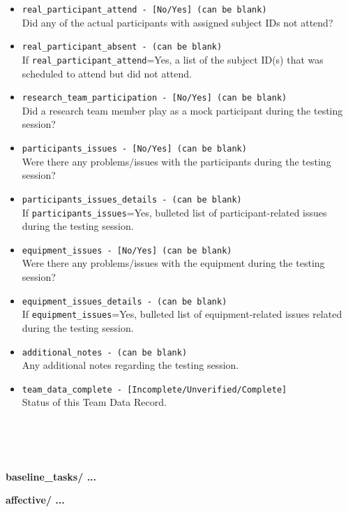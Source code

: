 \begin{description}
\begin{addmargin}[0em]{0em}
\begin{itemize}
            \item \verb|real_participant_attend - [No/Yes] (can be blank)|\\Did any of the actual participants with assigned subject IDs not attend?
            \item \verb|real_participant_absent - (can be blank)|\\If \verb|real_participant_attend|=Yes, a list of the subject ID(s) that was scheduled to attend but did not attend.
            \item \verb|research_team_participation - [No/Yes] (can be blank)|\\Did a research team member play as a mock participant during the testing session?
            \item \verb|participants_issues - [No/Yes] (can be blank)|\\Were there any problems/issues with the participants during the testing session?
            \item \verb|participants_issues_details - (can be blank)|\\If \verb|participants_issues|=Yes, bulleted list of participant-related issues during the testing session.
            \item \verb|equipment_issues - [No/Yes] (can be blank)|\\Were there any problems/issues with the equipment during the testing session?
            \item \verb|equipment_issues_details - (can be blank)|\\If \verb|equipment_issues|=Yes, bulleted list of equipment-related issues related during the testing session.
            \item \verb|additional_notes - (can be blank)|\\Any additional notes regarding the testing session.
            \item \verb|team_data_complete - [Incomplete/Unverified/Complete]|\\Status of this Team Data Record.
        \end{itemize}
    \end{addmargin} %



\textbf{\\\\\\}
\item\textbf{baseline\_tasks/ ...}
    \begin{addmargin}[0em]{0em} %
        \textbf{affective/ ...}


\end{addmargin}
\end{description}
